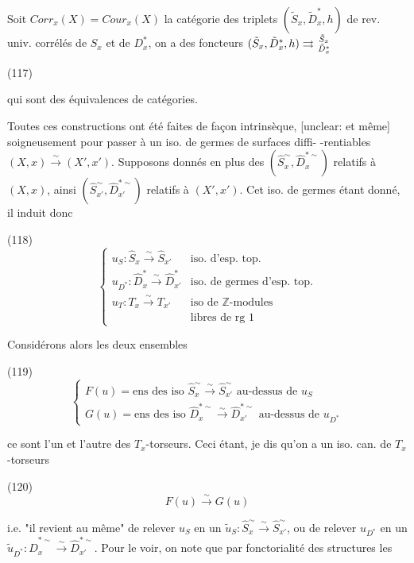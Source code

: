 Soit $Corr_x(X) = Cour_x(X)$ la catégorie des triplets $(\tilde{S}_x, \tilde{D}_x^*, h)$ de rev. univ. corrélés de $S_x$ et de $D_x^*$, on a des foncteurs $(\tilde{S}_x, \tilde{D}_x^*, h) \rightrightarrows {\tilde{S}_x \atop \tilde{D}_x^*}$

(117)

qui sont des équivalences de catégories.

\newpage


Toutes ces constructions ont été faites de façon
intrinsèque, [unclear: et même] soigneusement pour passer
à un iso. de germes de surfaces diffi-
-rentiables $(X,x) \xrightarrow{\sim} (X',x')$. Supposons
donnés en plus des $(\hat{S}_x^\sim, \hat{D}_x^{*\sim})$ relatifs à $(X,x)$,
ainsi $(\hat{S}_{x'}^\sim, \hat{D}_{x'}^{*\sim})$ relatifs à $(X',x')$.
Cet iso. de germes étant donné, il induit
donc

(118) $$ \begin{cases} u_S : \hat{S}_x \xrightarrow{\sim} \hat{S}_{x'} & \text{iso. d'esp. top.} \\ u_{D^*} : \hat{D}_x^* \xrightarrow{\sim} \hat{D}_{x'}^* & \text{iso. de germes d'esp. top.} \\ u_T : T_x \xrightarrow{\sim} T_{x'} & \text{iso de } \mathbb{Z}\text{-modules} \\ & \text{libres de rg } 1 \end{cases} $$

Considérons alors les
deux ensembles

(119) $$ \begin{cases} F(u) = \text{ens des iso } \hat{S}_x^\sim \xrightarrow{\sim} \hat{S}_{x'}^\sim \text{ au-dessus de } u_S \\ G(u) = \text{ens des iso } \hat{D}_x^{*\sim} \xrightarrow{\sim} \hat{D}_{x'}^{*\sim} \text{ au-dessus de } u_{D^*} \end{cases} $$

ce sont l'un et l'autre des $T_x$-torseurs.
Ceci étant, je dis qu'on a un iso. can.
de $T_x$-torseurs

(120) $$ F(u) \xrightarrow{\sim} G(u) $$

i.e. "il revient au même" de relever $u_S$ en
un $\tilde{u}_S : \hat{S}_x^\sim \xrightarrow{\sim} \hat{S}_{x'}^\sim$, ou de relever $u_{D^*}$ en un
$\tilde{u}_{D^*} : \hat{D}_x^{*\sim} \xrightarrow{\sim} \hat{D}_{x'}^{*\sim}$. Pour le voir, on
note que par fonctorialité des structures les


